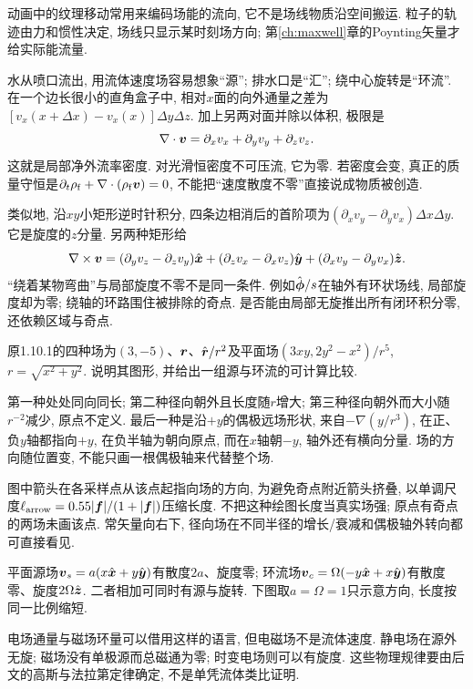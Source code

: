 动画中的纹理移动常用来编码场能的流向, 它不是场线物质沿空间搬运. 粒子的轨迹由力和惯性决定, 场线只显示某时刻场方向; 第\ref{ch:maxwell}章的Poynting矢量才给实际能流量.

\label{tb:fieldstructure}
水从喷口流出, 用流体速度场容易想象“源”; 排水口是“汇”; 绕中心旋转是“环流”. 在一个边长很小的直角盒子中, 相对$x$面的向外通量之差为$[v_x(x+\Delta x)-v_x(x)]\Delta y\Delta z$. 加上另两对面并除以体积, 极限是
\[
\nabla\cdot\boldsymbol{v}=\partial_xv_x+\partial_yv_y+\partial_zv_z.
\]
这就是局部净外流率密度. 对光滑恒密度不可压流, 它为零. 若密度会变, 真正的质量守恒是$\partial_t\rho_{\rm f}+\nabla\cdot(\rho_{\rm f}\boldsymbol{v})=0$, 不能把“速度散度不零”直接说成物质被创造.

类似地, 沿$xy$小矩形逆时针积分, 四条边相消后的首阶项为$(\partial_xv_y-\partial_yv_x)\Delta x\Delta y$. 它是旋度的$z$分量. 另两种矩形给
\[
\nabla\times\boldsymbol{v}=(\partial_yv_z-\partial_zv_y)\hat{\boldsymbol{x}}
 +(\partial_zv_x-\partial_xv_z)\hat{\boldsymbol{y}}
 +(\partial_xv_y-\partial_yv_x)\hat{\boldsymbol{z}}.
\]
“绕着某物弯曲”与局部旋度不零不是同一条件. 例如$\hat{\boldsymbol{\phi}}/s$在轴外有环状场线, 局部旋度却为零; 绕轴的环路围住被排除的奇点. 是否能由局部无旋推出所有闭环积分零, 还依赖区域与奇点.

\begin{example}\label{ex:fieldplots}
原1.10.1的四种场为$(3,-5)$、$\boldsymbol{r}$、$\hat{\boldsymbol{r}}/r^2$及平面场$(3xy,2y^2-x^2)/r^5$, $r=\sqrt{x^2+y^2}$. 说明其图形, 并给出一组源与环流的可计算比较.
\end{example}
\begin{solution}
第一种处处同向同长; 第二种径向朝外且长度随$r$增大; 第三种径向朝外而大小随$r^{-2}$减少, 原点不定义. 最后一种是沿$+y$的偶极远场形状, 来自$-\nabla(y/r^3)$, 在正、负$y$轴都指向$+y$, 在负半轴为朝向原点, 而在$x$轴朝$-y$, 轴外还有横向分量. 场的方向随位置变, 不能只画一根偶极轴来代替整个场.


图中箭头在各采样点从该点起指向场的方向, 为避免奇点附近箭头挤叠, 以单调尺度$\ell_{\rm arrow}=0.55|\boldsymbol{f}|/(1+|\boldsymbol{f}|)$压缩长度. 不把这种绘图长度当真实场强; 原点有奇点的两场未画该点. 常矢量向右下, 径向场在不同半径的增长/衰减和偶极轴外转向都可直接看见.

平面源场$\boldsymbol{v}_s=a(x\hat{\boldsymbol{x}}+y\hat{\boldsymbol{y}})$有散度$2a$、旋度零; 环流场$\boldsymbol{v}_c=\Omega(-y\hat{\boldsymbol{x}}+x\hat{\boldsymbol{y}})$有散度零、旋度$2\Omega\hat{\boldsymbol{z}}$. 二者相加可同时有源与旋转. 下图取$a=\Omega=1$只示意方向, 长度按同一比例缩短.
\begin{center}\end{center}
电场通量与磁场环量可以借用这样的语言, 但电磁场不是流体速度. 静电场在源外无旋; 磁场没有单极源而总磁通为零; 时变电场则可以有旋度. 这些物理规律要由后文的高斯与法拉第定律确定, 不是单凭流体类比证明.
\end{solution}

